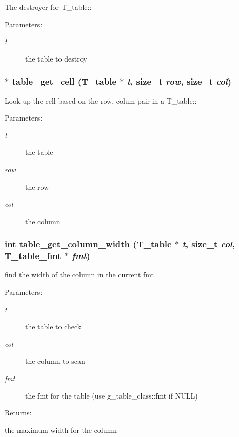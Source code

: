 The destroyer for T\_\-table::\begin{Desc}
\item[Parameters: ]\par
\begin{description}
\item[{\em 
t}]the table to destroy \end{description}
\end{Desc}
\subsubsection{$\ast$ table\_\-get\_\-cell ({\bf T\_\-table} $\ast$ {\em t}, size\_\-t {\em row}, size\_\-t {\em col})}\label{group__simple__table_a6}


Look up the cell based on the row, colum pair in a T\_\-table::\begin{Desc}
\item[Parameters: ]\par
\begin{description}
\item[{\em 
t}]the table \item[{\em 
row}]the row \item[{\em 
col}]the column \end{description}
\end{Desc}
\subsubsection{\setlength{\rightskip}{0pt plus 5cm}int table\_\-get\_\-column\_\-width ({\bf T\_\-table} $\ast$ {\em t}, size\_\-t {\em col}, {\bf T\_\-table\_\-fmt} $\ast$ {\em fmt})}\label{group__simple__table_a13}


find the width of the column in the current fmt \begin{Desc}
\item[Parameters: ]\par
\begin{description}
\item[{\em 
t}]the table to check \item[{\em 
col}]the column to scan \item[{\em 
fmt}]the fmt for the table (use g\_\-table\_\-class::fmt if NULL) \end{description}
\end{Desc}
\begin{Desc}
\item[Returns: ]\par
the maximum width for the column \end{Desc}
